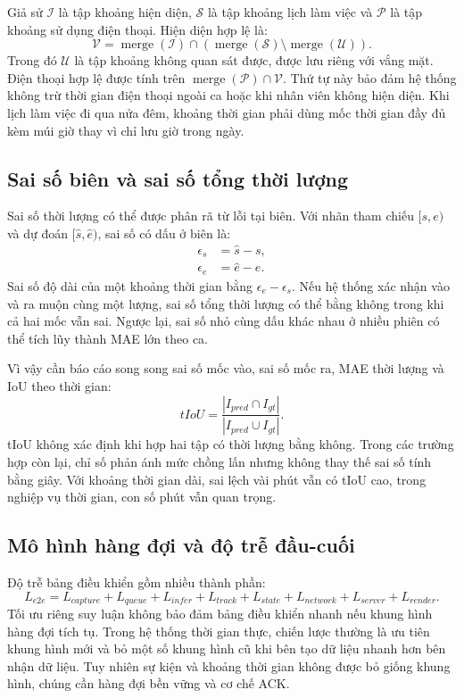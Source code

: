Giả sử $\mathcal{I}$ là tập khoảng hiện diện, $\mathcal{S}$ là tập khoảng lịch làm việc và $\mathcal{P}$ là tập khoảng sử dụng điện thoại. Hiện diện hợp lệ là:
\begin{equation}
 \mathcal{V}=\operatorname{merge}(\mathcal{I})\cap\left(\operatorname{merge}(\mathcal{S})\setminus\operatorname{merge}(\mathcal{U})\right).
\end{equation}
Trong đó $\mathcal{U}$ là tập khoảng không quan sát được, được lưu riêng với vắng mặt. Điện thoại hợp lệ được tính trên $\operatorname{merge}(\mathcal{P})\cap\mathcal{V}$. Thứ tự này bảo đảm hệ thống không trừ thời gian điện thoại ngoài ca hoặc khi nhân viên không hiện diện. Khi lịch làm việc đi qua nửa đêm, khoảng thời gian phải dùng mốc thời gian đầy đủ kèm múi giờ thay vì chỉ lưu giờ trong ngày.

\subsection{Sai số biên và sai số tổng thời lượng}
Sai số thời lượng có thể được phân rã từ lỗi tại biên. Với nhãn tham chiếu $[s,e)$ và dự đoán $[\hat{s},\hat{e})$, sai số có dấu ở biên là:
\begin{align}
 \epsilon_s &= \hat{s}-s,\\
 \epsilon_e &= \hat{e}-e.
\end{align}
Sai số độ dài của một khoảng thời gian bằng $\epsilon_e-\epsilon_s$. Nếu hệ thống xác nhận vào và ra muộn cùng một lượng, sai số tổng thời lượng có thể bằng không trong khi cả hai mốc vẫn sai. Ngược lại, sai số nhỏ cùng dấu khác nhau ở nhiều phiên có thể tích lũy thành MAE lớn theo ca.

Vì vậy cần báo cáo song song sai số mốc vào, sai số mốc ra, MAE thời lượng và IoU theo thời gian:
\begin{equation}
 tIoU=\frac{|I_{pred}\cap I_{gt}|}{|I_{pred}\cup I_{gt}|}.
\end{equation}
tIoU không xác định khi hợp hai tập có thời lượng bằng không. Trong các trường hợp còn lại, chỉ số phản ánh mức chồng lấn nhưng không thay thế sai số tính bằng giây. Với khoảng thời gian dài, sai lệch vài phút vẫn có tIoU cao, trong nghiệp vụ thời gian, con số phút vẫn quan trọng.

\subsection{Mô hình hàng đợi và độ trễ đầu-cuối}
Độ trễ bảng điều khiển gồm nhiều thành phần:
\begin{equation}
 L_{e2e}=L_{capture}+L_{queue}+L_{infer}+L_{track}+L_{state}+L_{network}+L_{server}+L_{render}.
\end{equation}
Tối ưu riêng suy luận không bảo đảm bảng điều khiển nhanh nếu khung hình hàng đợi tích tụ. Trong hệ thống thời gian thực, chiến lược thường là ưu tiên khung hình mới và bỏ một số khung hình cũ khi bên tạo dữ liệu nhanh hơn bên nhận dữ liệu. Tuy nhiên sự kiện và khoảng thời gian không được bỏ giống khung hình, chúng cần hàng đợi bền vững và cơ chế ACK.

